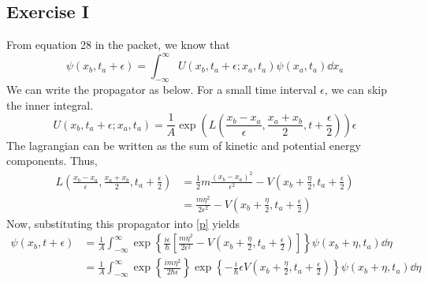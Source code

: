 \subsection{Exercise I}
From equation 28 in the packet, we know that 
\begin{equation}
    \psi (x_b, t_a+\epsilon) = \int_{-\infty}^{\infty}U(x_b, t_a+\epsilon; x_a, t_a) \psi(x_a, t_a) \dd x_a
\end{equation}
We can write the propagator as below. For a small time interval $\epsilon$, we can skip the inner integral. 
\begin{equation}\label{p}
    U(x_b, t_a+\epsilon; x_a, t_a) = \frac{1}{A} \exp \left(L \left(\frac{x_b - x_a}{\epsilon}, \frac{x_a + x_b}{2}, t + \frac{\epsilon}{2} \right)\right)\epsilon
\end{equation}
The lagrangian can be written as the sum of kinetic and potential energy components. Thus, 
\begin{align}
    L \left(\frac{x_b - x_a}{\epsilon}, \frac{x_a + x_b}{2}, t_a + \frac{\epsilon}{2} \right) &= \frac{1}{2}m\frac{(x_b - x_a)^2}{\epsilon^2} - V\left(x_b + \frac{\eta}{2}, t_a + \frac{\epsilon}{2}\right) \\
    &= \frac{m \eta^2}{2\epsilon^2} - V\left(x_b + \frac{\eta}{2}, t_a + \frac{\epsilon}{2}\right)
\end{align} 
Now, substituting this propagator into \eqref{p} yields 
\begin{align}
    \psi (x_b, t+\epsilon) &= \frac{1}{A} \int_{-\infty}^{\infty}\exp \left\{\frac{i\epsilon}{\hbar}\left[\frac{m \eta^2}{2\epsilon^2} - V\left(x_b + \frac{\eta}{2}, t_a + \frac{\epsilon}{2}\right)\right]\right\}\psi (x_b + \eta, t_a) \dd \eta  \\
    &= \frac{1}{A}\int_{-\infty}^{\infty}\exp\left\{\frac{im\eta^2}{2\hbar \epsilon}\right\}\exp\left\{-\frac{i}{\hbar}\epsilon V \left(x_b + \frac{\eta}{2}, t_a + \frac{\epsilon}{2}\right)\right\}\psi (x_b + \eta, t_a) \dd \eta 
\end{align}


